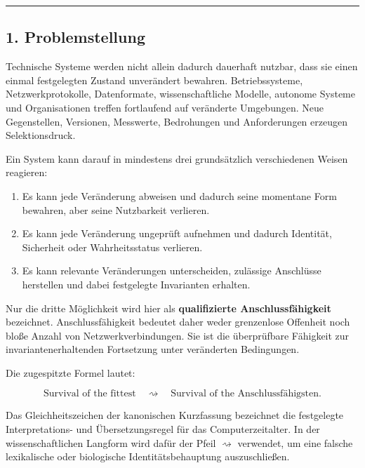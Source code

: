 \documentclass[
  10pt,
  a4paper,
]{article}
\providecommand{\tightlist}{%
  \setlength{\itemsep}{0pt}\setlength{\parskip}{0pt}}
\begin{document}
\begin{center}\rule{0.5\linewidth}{0.5pt}\end{center}

\hypertarget{problemstellung}{%
\subsection{1. Problemstellung}\label{problemstellung}}

Technische Systeme werden nicht allein dadurch dauerhaft nutzbar, dass
sie einen einmal festgelegten Zustand unverändert bewahren.
Betriebssysteme, Netzwerkprotokolle, Datenformate, wissenschaftliche
Modelle, autonome Systeme und Organisationen treffen fortlaufend auf
veränderte Umgebungen. Neue Gegenstellen, Versionen, Messwerte,
Bedrohungen und Anforderungen erzeugen Selektionsdruck.

Ein System kann darauf in mindestens drei grundsätzlich verschiedenen
Weisen reagieren:

\begin{enumerate}
\def\labelenumi{\arabic{enumi}.}
\tightlist
\item
  Es kann jede Veränderung abweisen und dadurch seine momentane Form
  bewahren, aber seine Nutzbarkeit verlieren.
\item
  Es kann jede Veränderung ungeprüft aufnehmen und dadurch Identität,
  Sicherheit oder Wahrheitsstatus verlieren.
\item
  Es kann relevante Veränderungen unterscheiden, zulässige Anschlüsse
  herstellen und dabei festgelegte Invarianten erhalten.
\end{enumerate}

Nur die dritte Möglichkeit wird hier als \textbf{qualifizierte
Anschlussfähigkeit} bezeichnet. Anschlussfähigkeit bedeutet daher weder
grenzenlose Offenheit noch bloße Anzahl von Netzwerkverbindungen. Sie
ist die überprüfbare Fähigkeit zur invariantenerhaltenden Fortsetzung
unter veränderten Bedingungen.

Die zugespitzte Formel lautet:

\[
\boxed{\text{Survival of the fittest}
\quad\rightsquigarrow\quad
\text{Survival of the Anschlussfähigsten}.}
\]

Das Gleichheitszeichen der kanonischen Kurzfassung bezeichnet die
festgelegte Interpretations- und Übersetzungsregel für das
Computerzeitalter. In der wissenschaftlichen Langform wird dafür der
Pfeil \(\rightsquigarrow\) verwendet, um eine falsche lexikalische oder
biologische Identitätsbehauptung auszuschließen.
\end{document}
